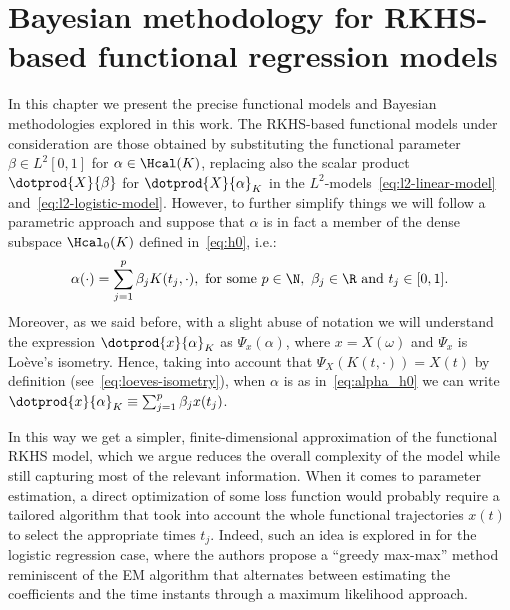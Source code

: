 %
%

\let\epsilon\varepsilon
\setlength{\footskip}{50.75pt}

\chapter{Bayesian methodology for RKHS-based functional regression models}\label{ch:bayesian}

In this chapter we present the precise functional models and Bayesian methodologies explored in this work. The RKHS-based functional models under consideration \citep[see][]{berrendero2023functional, berrendero2019rkhs} are those obtained by substituting the functional parameter \(\beta\in L^2[0,1]\) for \(\alpha \in \Hcal(K)\), replacing also the scalar product \(\dotprod{X}{\beta}\) for \(\dotprod{X}{\alpha}_K\) in the \(L^2\)-models~\eqref{eq:l2-linear-model} and~\eqref{eq:l2-logistic-model}. However, to further simplify things we will follow a parametric approach and suppose that \(\alpha\) is in fact a member of the dense subspace \(\Hcal_0(K)\) defined in~\eqref{eq:h0}, i.e.:
\begin{equation}\label{eq:alpha_h0}
\alpha(\cdot) = \sum_{j=1}^p \beta_j K(t_j, \cdot), \text{ for some } p \in \N, \ \beta_j \in \R \text{ and } t_j \in [0,1].
\end{equation}
Moreover, as we said before, with a slight abuse of notation we will understand the expression \(\dotprod{x}{\alpha}_K\) as \(\Psi_x(\alpha)\), where \(x=X(\omega)\) and \(\Psi_x\) is Loève's isometry. Hence, taking into account that \(\Psi_X(K(t, \cdot)) = X(t)\) by definition (see~\eqref{eq:loeves-isometry}), when \(\alpha\) is as in~\eqref{eq:alpha_h0} we can write \(\dotprod{x}{\alpha}_K \equiv \sum_{j=1}^p \beta_j x(t_j)\).

In this way we get a simpler, finite-dimensional approximation of the functional RKHS model, which we argue reduces the overall complexity of the model while still capturing most of the relevant information. When it comes to parameter estimation, a direct optimization of some loss function would probably require a tailored algorithm that took into account the whole functional trajectories \(x(t)\) to select the appropriate times \(t_j\). Indeed, such an idea is explored in \citet{berrendero2023functional} for the logistic regression case, where the authors propose a ``greedy max-max'' method reminiscent of the EM algorithm that alternates between estimating the coefficients and the time instants through a maximum likelihood approach.

